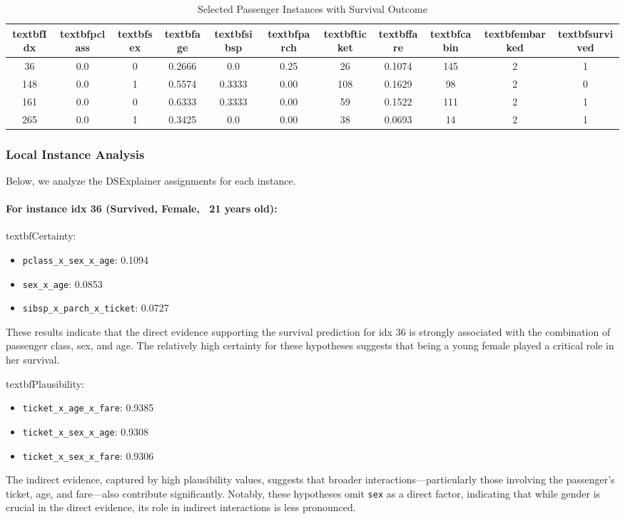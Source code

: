 \documentclass[acmlarge]{acmart}
\begin{document}
\begin{table}[H]
    \caption{Selected Passenger Instances with Survival Outcome}
    \label{tab:instance_data_survival}
    \centering
    \begin{tabular}{|c|c|c|c|c|c|c|c|c|c|c|}
        \hline
        textbf{Idx} & textbf{pclass} & textbf{sex} & textbf{age} & textbf{sibsp} & textbf{parch} & textbf{ticket} & textbf{fare} & textbf{cabin} & textbf{embarked} & textbf{survived}\\
        \hline
        36  & 0.0 & 0 & 0.2666 & 0.0    & 0.25 & 26  & 0.1074 & 145 & 2 & 1 \\
        148 & 0.0 & 1 & 0.5574 & 0.3333 & 0.00 & 108 & 0.1629 & 98  & 2 & 0 \\
        161 & 0.0 & 0 & 0.6333 & 0.3333 & 0.00 & 59  & 0.1522 & 111 & 2 & 1 \\
        265 & 0.0 & 1 & 0.3425 & 0.0    & 0.00 & 38  & 0.0693 & 14  & 2 & 1 \\
        \hline
    \end{tabular}
\end{table}

\subsubsection{Local Instance Analysis}

Below, we analyze the DSExplainer assignments for each instance. 
\paragraph{For instance idx 36 (Survived, Female, ~21 years old):} 
\newline 
textbf{Certainty:}
\begin{itemize}
    \item \texttt{pclass\_x\_sex\_x\_age}: 0.1094
    \item \texttt{sex\_x\_age}: 0.0853
    \item \texttt{sibsp_x_parch_x_ticket}: 0.0727
\end{itemize}
These results indicate that the direct evidence supporting the survival prediction for idx 36 is strongly associated with the combination of passenger class, sex, and age. The relatively high certainty for these hypotheses suggests that being a young female played a critical role in her survival.

textbf{Plausibility:}
\begin{itemize}
    \item \texttt{ticket_x_age_x_fare}: 0.9385
    \item \texttt{ticket_x_sex_x_age}: 0.9308
    \item \texttt{ticket_x_sex_x_fare}: 0.9306
\end{itemize}
The indirect evidence, captured by high plausibility values, suggests that broader interactions—particularly those involving the passenger's ticket, age, and fare—also contribute significantly. Notably, these hypotheses omit \texttt{sex} as a direct factor, indicating that while gender is crucial in the direct evidence, its role in indirect interactions is less pronounced.
\end{document}
